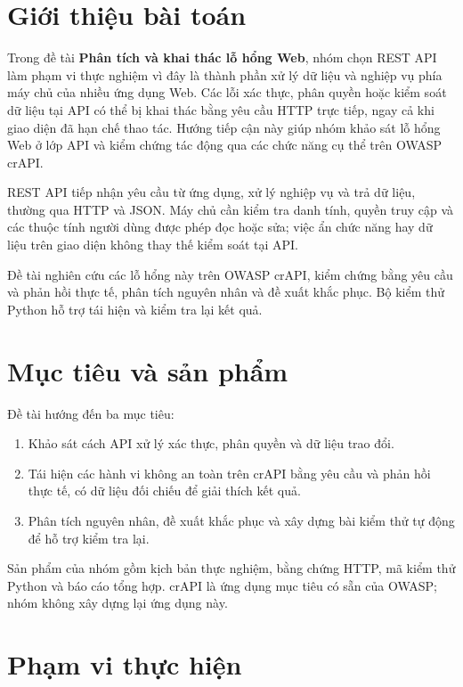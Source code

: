 \documentclass[oneside,a4paper,12pt]{extreport}
\begin{document}
\section{Giới thiệu bài toán}

Trong đề tài \textbf{Phân tích và khai thác lỗ hổng Web}, nhóm chọn
REST API làm phạm vi thực nghiệm vì đây là thành phần xử lý dữ liệu
và nghiệp vụ phía máy chủ của nhiều ứng dụng Web. Các lỗi xác thực,
phân quyền hoặc kiểm soát dữ liệu tại API có thể bị khai thác bằng
yêu cầu HTTP trực tiếp, ngay cả khi giao diện đã hạn chế thao tác.
Hướng tiếp cận này giúp nhóm khảo sát lỗ hổng Web ở lớp API và kiểm
chứng tác động qua các chức năng cụ thể trên OWASP crAPI.

REST API tiếp nhận yêu cầu từ ứng dụng, xử lý nghiệp vụ và trả dữ
liệu, thường qua HTTP và JSON. Máy chủ cần kiểm tra danh tính, quyền
truy cập và các thuộc tính người dùng được phép đọc hoặc sửa; việc ẩn
chức năng hay dữ liệu trên giao diện không thay thế kiểm soát tại API.

Đề tài nghiên cứu các lỗ hổng này trên OWASP crAPI, kiểm chứng bằng
yêu cầu và phản hồi thực tế, phân tích nguyên nhân và đề xuất khắc
phục. Bộ kiểm thử Python hỗ trợ tái hiện và kiểm tra lại kết quả.

\section{Mục tiêu và sản phẩm}

Đề tài hướng đến ba mục tiêu:
\begin{enumerate}
    \item Khảo sát cách API xử lý xác thực, phân quyền và dữ liệu trao đổi.
    \item Tái hiện các hành vi không an toàn trên crAPI bằng yêu cầu và
    phản hồi thực tế, có dữ liệu đối chiếu để giải thích kết quả.
    \item Phân tích nguyên nhân, đề xuất khắc phục và xây dựng bài kiểm
    thử tự động để hỗ trợ kiểm tra lại.
\end{enumerate}

Sản phẩm của nhóm gồm kịch bản thực nghiệm, bằng chứng HTTP, mã kiểm
thử Python và báo cáo tổng hợp. crAPI là ứng dụng mục tiêu có sẵn của
OWASP; nhóm không xây dựng lại ứng dụng này.

\section{Phạm vi thực hiện}
\end{document}

